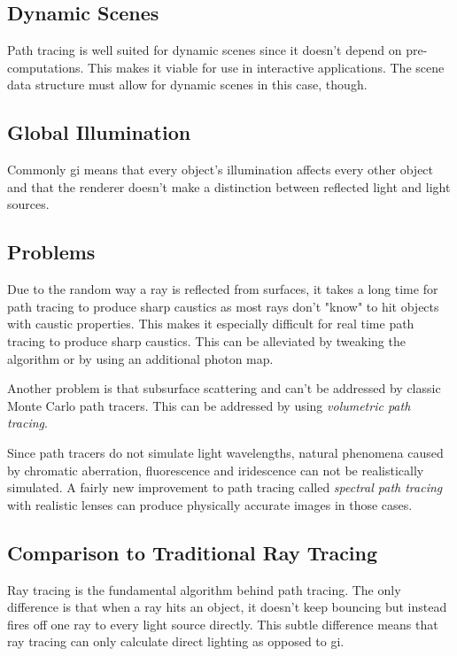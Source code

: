\documentclass[
  twoside,
  11pt, a4paper,
  footinclude=true,
  headinclude=true,
  cleardoublepage=empty
]{scrreprt}
\begin{document}
\subsection{Dynamic Scenes}
Path tracing is well suited for dynamic scenes since it doesn't depend on pre-computations. This
makes it viable for use in interactive applications. The scene data structure must allow for
dynamic scenes in this case, though.

\subsection{Global Illumination}
Commonly \acf{gi} means that every object's illumination affects every other object and that the
renderer doesn't make a distinction between reflected light and light sources.

\subsection{Problems}
Due to the random way a ray is reflected from surfaces, it takes a long time for path tracing to
produce sharp caustics as most rays don't "know" to hit objects with caustic properties. This makes
it especially difficult for real time path tracing to produce sharp caustics. This can be
alleviated by tweaking the algorithm or by using an additional photon map.

Another problem is that subsurface scattering and can't be addressed by classic Monte Carlo path
tracers. This can be addressed by using \emph{volumetric path tracing}.
\cite{wiki:volumetric-path-tracing} \cite{incollection:volumetric-path-tracing}

Since path tracers do not simulate light wavelengths, natural phenomena caused by chromatic
aberration, fluorescence and iridescence can not be realistically simulated. A fairly new
improvement to path tracing called \emph{spectral path tracing} with realistic lenses can produce
physically accurate images in those cases. \cite{inproceedings:realistic-lenses} \cite{site:lambda}
\cite{site:luculentus} \cite{site:robigo-luculenta}


\subsection{Comparison to Traditional Ray Tracing}
Ray tracing is the fundamental algorithm behind path tracing. The only difference is that when a
ray hits an object, it doesn't keep bouncing but instead fires off one ray to every light source
directly. This subtle difference means that ray tracing can only calculate direct lighting as
opposed to \ac{gi}.
\end{document}
